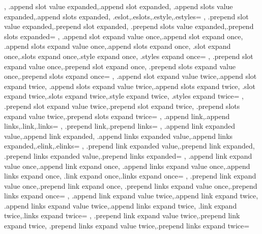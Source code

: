 {{{    },
    {.append slot value expanded,.append slot expanded,
      .append slots value expanded,.append slots expanded,
      .eslot,.eslots,.estyle,.estyles}={
    },
    {.prepend slot value expanded,.prepend slot expanded,
      .prepend slots value expanded,.prepend slots expanded}={
    },
    {.append slot expand value once,.append slot expand once,
      .append slots expand value once,.append slots expand once,
      .slot expand once,.slots expand once,.style expand once,
      .styles expand once}={
    },
    {.prepend slot expand value once,.prepend slot expand once,
      .prepend slots expand value once,.prepend slots expand once}={
    },
    {.append slot expand value twice,.append slot expand twice,
      .append slots expand value twice,.append slots expand twice,
      .slot expand twice,.slots expand twice,.style expand twice,
      .styles expand twice}={
    },
    {.prepend slot expand value twice,.prepend slot expand twice,
      .prepend slots expand value twice,.prepend slots expand twice}={
    },
    {.append link,.append links,.link,.links}={
    },
    {.prepend link,.prepend links}={
    },
    {.append link expanded value,.append link expanded,
      .append links expanded value,.append links expanded,.elink,.elinks}={
    },
    {.prepend link expanded value,.prepend link expanded,
      .prepend links expanded value,.prepend links expanded}={
    },
    {.append link expand value once,.append link expand once,
      .append links expand value once,.append links expand once,
      .link expand once,.links expand once}={
    },
    {.prepend link expand value once,.prepend link expand once,
      .prepend links expand value once,.prepend links expand once}={
    },
    {.append link expand value twice,.append link expand twice,
      .append links expand value twice,.append links expand twice,
      .link expand twice,.links expand twice}={
    },
    {.prepend link expand value twice,.prepend link expand twice,
      .prepend links expand value twice,.prepend links expand twice}={
}}}
